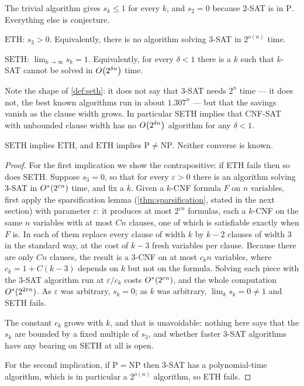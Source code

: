 The trivial algorithm gives $s_k \le 1$ for every $k$, and $s_2 = 0$ because
$2$-SAT is in $\mathrm{P}$. Everything else is conjecture.

\begin{definition}\label{def:eth}
$\mathrm{ETH}$: $s_3 > 0$. Equivalently, there is no algorithm solving $3$-SAT
in $2^{o(n)}$ time.
\end{definition}

\begin{definition}\label{def:seth}
$\mathrm{SETH}$: $\lim_{k \to \infty} s_k = 1$. Equivalently, for every
$\delta < 1$ there is a $k$ such that $k$-SAT cannot be solved in
$O\!\left(2^{\delta n}\right)$ time.
\end{definition}

Note the shape of \cref{def:seth}: it does not say that $3$-SAT needs $2^n$
time --- it does not, the best known algorithms run in about $1.307^n$ --- but
that the savings vanish as the clause width grows. In particular SETH implies
that CNF-SAT with unbounded clause width has no $O\!\left(2^{\delta n}\right)$
algorithm for any $\delta < 1$.

\begin{proposition}\label{prop:eth-seth-p-np}
$\mathrm{SETH}$ implies $\mathrm{ETH}$, and $\mathrm{ETH}$ implies
$\mathrm{P} \ne \mathrm{NP}$. Neither converse is known.
\end{proposition}

\begin{proof}
For the first implication we show the contrapositive: if ETH fails then so does
SETH. Suppose $s_3 = 0$, so that for every $\varepsilon > 0$ there is an
algorithm solving $3$-SAT in $O^{*}(2^{\varepsilon n})$ time, and fix a $k$.
Given a $k$-CNF formula $F$ on $n$ variables, first apply the sparsification
lemma (\cref{thm:sparsification}, stated in the next section) with parameter
$\varepsilon$: it produces at most $2^{\varepsilon n}$ formulas, each a $k$-CNF
on the same $n$ variables with at most $Cn$ clauses, one of which is
satisfiable exactly when $F$ is. In each of them replace every clause of width
$k$ by $k-2$ clauses of width $3$ in the standard way, at the cost of $k-3$
fresh variables per clause. Because there are only $Cn$ clauses, the result is
a $3$-CNF on at most $c_k n$ variables, where $c_k = 1 + C(k-3)$ depends on $k$
but not on the formula. Solving each piece with the $3$-SAT algorithm run at
$\varepsilon/c_k$ costs $O^{*}(2^{\varepsilon n})$, and the whole computation
$O^{*}(2^{2\varepsilon n})$. As $\varepsilon$ was arbitrary, $s_k = 0$; as $k$
was arbitrary, $\lim_k s_k = 0 \ne 1$ and SETH fails.

The constant $c_k$ grows with $k$, and that is unavoidable: nothing here says
that the $s_k$ are bounded by a fixed multiple of $s_3$, and whether faster
$3$-SAT algorithms have any bearing on SETH at all is open.

For the second implication, if $\mathrm{P} = \mathrm{NP}$ then $3$-SAT has a
polynomial-time algorithm, which is in particular a $2^{o(n)}$ algorithm, so
ETH fails.
\end{proof}

